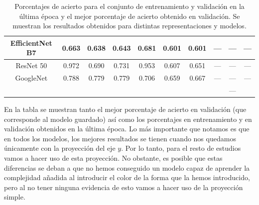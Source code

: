 \documentclass[a4paper,12pt,twoside,titlepage]{article}
\begin{document}
\begin{table}[h!]
{\begin{tabular}{cccccccccc}
  \multicolumn{1}{|c|}{EfficientNet B7}          & \multicolumn{1}{c|}{0.663} & \multicolumn{1}{c|}{0.638} & \multicolumn{1}{c|}{0.643}      & \multicolumn{1}{c|}{0.681} & \multicolumn{1}{c|}{0.601} & \multicolumn{1}{c|}{0.601}      & \multicolumn{1}{c|}{---}       & \multicolumn{1}{c|}{---}      & \multicolumn{1}{c|}{---}             \\ \hline
  \multicolumn{1}{|c|}{ResNet 50}                & \multicolumn{1}{c|}{0.972} & \multicolumn{1}{c|}{0.690} & \multicolumn{1}{c|}{0.731}      & \multicolumn{1}{c|}{0.953} & \multicolumn{1}{c|}{0.607} & \multicolumn{1}{c|}{0.651}      & \multicolumn{1}{c|}{---}       & \multicolumn{1}{c|}{---}      & \multicolumn{1}{c|}{---}             \\ \hline
  \multicolumn{1}{|c|}{GoogleNet}                & \multicolumn{1}{c|}{0.788} & \multicolumn{1}{c|}{0.779} & \multicolumn{1}{c|}{0.779}      & \multicolumn{1}{c|}{0.706} & \multicolumn{1}{c|}{0.659} & \multicolumn{1}{c|}{0.667}      & \multicolumn{1}{c|}{---}       & \multicolumn{1}{c|}{---}      & \multicolumn{1}{c|}{---}             \\ \hline
  \multicolumn{1}{l}{}                           & \multicolumn{1}{l}{}       & \multicolumn{1}{l}{}       & \multicolumn{1}{l}{}            & \multicolumn{1}{l}{}       & \multicolumn{1}{l}{}       & \multicolumn{1}{l}{}            & \multicolumn{1}{l}{}           & ---                           & \multicolumn{1}{l}{}                
  \end{tabular}
  }
  \caption{Porcentajes de acierto para el conjunto de entrenamiento y validación en la última época y el mejor porcentaje de acierto obtenido en validación. Se muestran los resultados obtenidos para distintas representaciones y modelos.}
  \label{tab:estudio_repre}
\end{table}


En la tabla se muestran tanto el mejor porcentaje de acierto en validación (que corresponde al modelo guardado) así como los porcentajes en entrenamiento y en validación obtenidos en la última época. Lo más importante que notamos es que en todos los modelos, los mejores resultados se tienen cuando nos quedamos únicamente con la proyección del eje $y$. Por lo tanto, para el resto de estudios vamos a hacer uso de esta proyección. No obstante, es posible que estas diferencias se deban a que no hemos conseguido un modelo capaz de aprender la complejidad añadida al introducir el color de la forma que la hemos introducido, pero al no tener ninguna evidencia de esto vamos a hacer uso de la proyección simple.   
\end{document}
